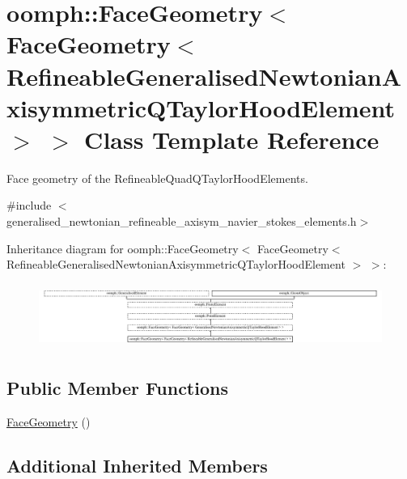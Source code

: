 \hypertarget{classoomph_1_1FaceGeometry_3_01FaceGeometry_3_01RefineableGeneralisedNewtonianAxisymmetricQTaylorHoodElement_01_4_01_4}{}\section{oomph\+:\+:Face\+Geometry$<$ Face\+Geometry$<$ Refineable\+Generalised\+Newtonian\+Axisymmetric\+Q\+Taylor\+Hood\+Element $>$ $>$ Class Template Reference}
\label{classoomph_1_1FaceGeometry_3_01FaceGeometry_3_01RefineableGeneralisedNewtonianAxisymmetricQTaylorHoodElement_01_4_01_4}


Face geometry of the Refineable\+Quad\+Q\+Taylor\+Hood\+Elements.  




{\ttfamily \#include $<$generalised\+\_\+newtonian\+\_\+refineable\+\_\+axisym\+\_\+navier\+\_\+stokes\+\_\+elements.\+h$>$}

Inheritance diagram for oomph\+:\+:Face\+Geometry$<$ Face\+Geometry$<$ Refineable\+Generalised\+Newtonian\+Axisymmetric\+Q\+Taylor\+Hood\+Element $>$ $>$\+:\begin{figure}[H]
\begin{center}
\leavevmode
\includegraphics[height=2.127660cm]{classoomph_1_1FaceGeometry_3_01FaceGeometry_3_01RefineableGeneralisedNewtonianAxisymmetricQTaylorHoodElement_01_4_01_4}
\end{center}
\end{figure}
\subsection*{Public Member Functions}
\begin{DoxyCompactItemize}
\item 
\hyperlink{classoomph_1_1FaceGeometry_3_01FaceGeometry_3_01RefineableGeneralisedNewtonianAxisymmetricQTaylorHoodElement_01_4_01_4_a9d8669ff8e6828f935e46ca93166cdbb}{Face\+Geometry} ()
\end{DoxyCompactItemize}
\subsection*{Additional Inherited Members}


